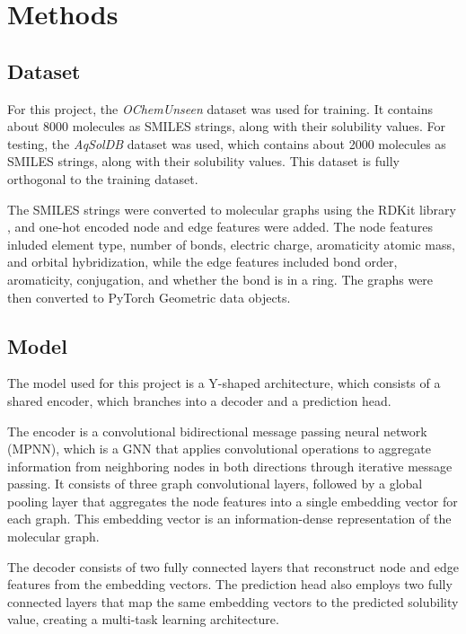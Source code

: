 \documentclass[11pt,a4paper]{article}
\begin{document}
\section{Methods}
\subsection{Dataset}

For this project, the \textit{OChemUnseen} dataset \cite{llompart2024will} was used for training. It contains about 8000 molecules as SMILES strings, along with their solubility values. For testing, the \textit{AqSolDB} dataset \cite{sorkun2019aqsoldb} was used, which contains about 2000 molecules as SMILES strings, along with their solubility values. This dataset is fully orthogonal to the training dataset.

The SMILES strings were converted to molecular graphs using the RDKit library \cite{rdkit}, and one-hot encoded node and edge features were added. The node features inluded element type, number of bonds, electric charge, aromaticity atomic mass, and orbital hybridization, while the edge features included bond order, aromaticity, conjugation, and whether the bond is in a ring. The graphs were then converted to PyTorch Geometric data objects.

\subsection{Model}

The model used for this project is a Y-shaped architecture, which consists of a shared encoder, which branches into a decoder and a prediction head.

The encoder is a convolutional bidirectional message passing neural network (MPNN), which is a GNN that applies convolutional operations to aggregate information from neighboring nodes in both directions through iterative message passing. It consists of three graph convolutional layers, followed by a global pooling layer that aggregates the node features into a single embedding vector for each graph. This embedding vector is an information-dense representation of the molecular graph.

The decoder consists of two fully connected layers that reconstruct node and edge features from the embedding vectors. The prediction head also employs two fully connected layers that map the same embedding vectors to the predicted solubility value, creating a multi-task learning architecture.
\end{document}
